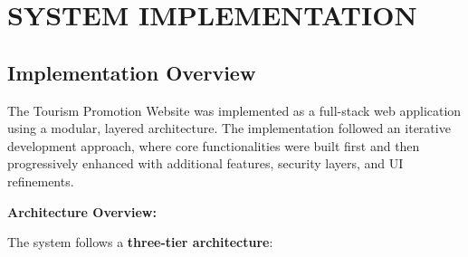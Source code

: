\chapter{SYSTEM IMPLEMENTATION}

\section{Implementation Overview}

The Tourism Promotion Website was implemented as a full-stack web application using a modular, layered architecture. The implementation followed an iterative development approach, where core functionalities were built first and then progressively enhanced with additional features, security layers, and UI refinements.

\textbf{Architecture Overview:}

The system follows a \textbf{three-tier architecture}:

